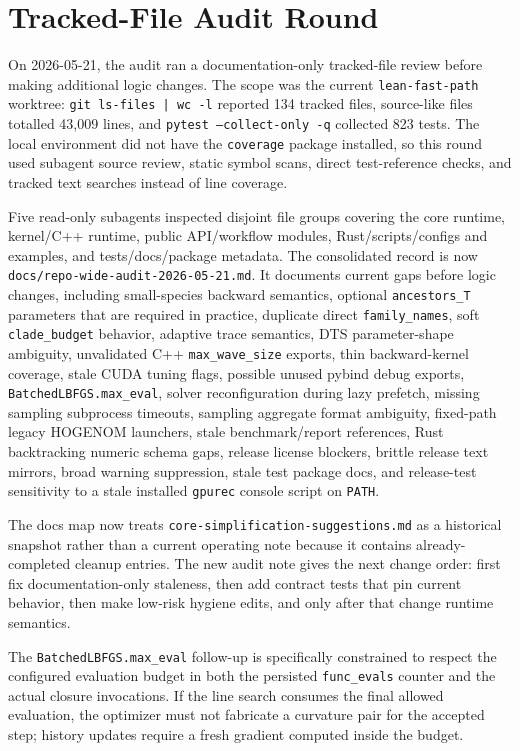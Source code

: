 \documentclass[11pt]{article}
\begin{document}
\section{Tracked-File Audit Round}

On 2026-05-21, the audit ran a documentation-only tracked-file review before
making additional logic changes.  The scope was the current
\texttt{lean-fast-path} worktree: \texttt{git ls-files | wc -l} reported 134
tracked files, source-like files totalled 43,009 lines, and
\texttt{pytest --collect-only -q} collected 823 tests.  The local environment
did not have the \texttt{coverage} package installed, so this round used
subagent source review, static symbol scans, direct test-reference checks, and
tracked text searches instead of line coverage.

Five read-only subagents inspected disjoint file groups covering the core
runtime, kernel/C++ runtime, public API/workflow modules, Rust/scripts/configs
and examples, and tests/docs/package metadata.  The consolidated record is now
\texttt{docs/repo-wide-audit-2026-05-21.md}.  It documents current gaps before
logic changes, including small-species backward semantics, optional
\texttt{ancestors\_T} parameters that are required in practice, duplicate direct
\texttt{family\_names}, soft \texttt{clade\_budget} behavior, adaptive trace
semantics, DTS parameter-shape ambiguity, unvalidated C++ \texttt{max\_wave\_size}
exports, thin backward-kernel coverage, stale CUDA tuning flags, possible
unused pybind debug exports, \texttt{BatchedLBFGS.max\_eval}, solver
reconfiguration during lazy prefetch, missing sampling subprocess timeouts,
sampling aggregate format ambiguity, fixed-path legacy HOGENOM launchers,
stale benchmark/report references, Rust backtracking numeric schema gaps,
release license blockers, brittle release text mirrors, broad warning
suppression, stale test package docs, and release-test sensitivity to a stale
installed \texttt{gpurec} console script on \texttt{PATH}.

The docs map now treats \texttt{core-simplification-suggestions.md} as a
historical snapshot rather than a current operating note because it contains
already-completed cleanup entries.  The new audit note gives the next change
order: first fix documentation-only staleness, then add contract tests that pin
current behavior, then make low-risk hygiene edits, and only after that change
runtime semantics.

The \texttt{BatchedLBFGS.max\_eval} follow-up is specifically constrained to
respect the configured evaluation budget in both the persisted
\texttt{func\_evals} counter and the actual closure invocations.  If the line
search consumes the final allowed evaluation, the optimizer must not fabricate a
curvature pair for the accepted step; history updates require a fresh gradient
computed inside the budget.
\end{document}
